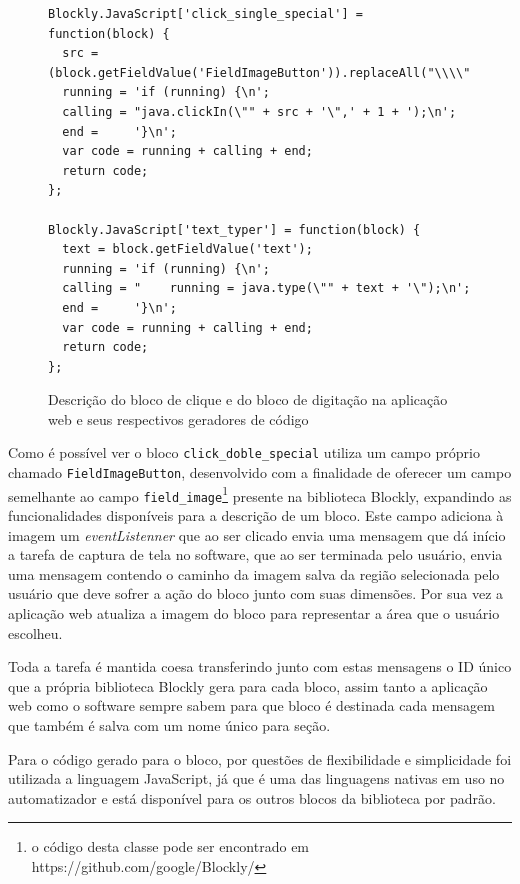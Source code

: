 \documentclass[tg]{mdtufsm}
\makeatletter
\newcommand\footnoteref[1]{\protected@xdef\@thefnmark{\ref{#1}}\@footnotemark}
\makeatother
\begin{document}
\begin{figure}[!htb]
\begin{lstlisting}
Blockly.JavaScript['click_single_special'] = function(block) {
  src = (block.getFieldValue('FieldImageButton')).replaceAll("\\\\","\\\\");
  running = 'if (running) {\n';
  calling = "java.clickIn(\"" + src + '\",' + 1 + ');\n';
  end =     '}\n';
  var code = running + calling + end;
  return code;
};

Blockly.JavaScript['text_typer'] = function(block) {
  text = block.getFieldValue('text');
  running = 'if (running) {\n';
  calling = "    running = java.type(\"" + text + '\");\n';
  end =     '}\n';
  var code = running + calling + end;
  return code;
};
\end{lstlisting}
    \caption{Descrição do bloco de clique e do bloco de digitação na aplicação web e seus respectivos geradores de código}
    \label{code:myBlocks2.js}
\end{figure}

                    Como é possível ver o bloco \texttt{click\_doble\_special} utiliza um campo próprio chamado \texttt{FieldImageButton}\footnoteref{note1}, desenvolvido com a finalidade de oferecer um campo semelhante ao  campo \texttt{field\_image}\footnote{o código desta classe pode ser encontrado em https://github.com/google/Blockly/} presente na biblioteca Blockly, expandindo as funcionalidades disponíveis para a descrição de um bloco. Este campo adiciona à imagem um \emph{eventListenner} que ao ser clicado envia uma mensagem que dá início a tarefa de captura de tela no software, que ao ser terminada pelo usuário, envia uma mensagem contendo o caminho da imagem salva da região selecionada pelo usuário que deve sofrer a ação do bloco junto com suas dimensões. Por sua vez a aplicação web atualiza a imagem do bloco para representar a área que o usuário escolheu.

                    Toda a tarefa é mantida coesa transferindo junto com estas mensagens o ID único que a própria biblioteca Blockly gera para cada bloco, assim tanto a aplicação web como o software sempre sabem para que bloco é destinada cada mensagem que também é salva com um nome único para seção.

                    Para o código gerado para o bloco, por questões de flexibilidade e simplicidade foi utilizada a linguagem JavaScript, já que é uma das linguagens nativas em uso no automatizador e está disponível para os outros blocos da biblioteca por padrão.
\end{document}
